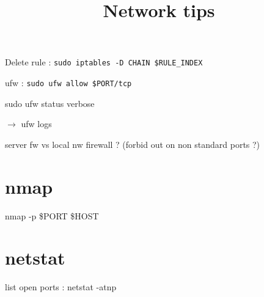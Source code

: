 


\title{Network tips}



\date{}


\maketitle

\justify

\renewcommand{\abstractname}{}

\begin{abstract}

\end{abstract}




Delete rule : \texttt{sudo iptables -D CHAIN \$RULE_INDEX}

ufw : \texttt{sudo ufw allow \$PORT/tcp}

sudo ufw status verbose

$\rightarrow$ ufw logs

server fw vs local nw firewall ? (forbid out on non standard ports ?)


\section*{nmap}

nmap -p \$PORT \$HOST 


\section*{netstat}

list open ports : netstat -atnp












